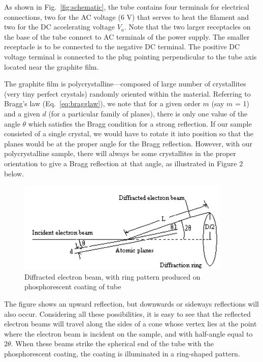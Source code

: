 As shown in Fig.~\ref{fig:schematic}, the tube contains four terminals for electrical
connections, two for the AC voltage (6 V) that serves to heat the
filament and two for the DC accelerating voltage $V_a$.
 Note that the two larger receptacles on the base of the tube connect
to AC terminals of the power supply.  The smaller receptacle is to be
connected to the negative DC terminal.  The positive DC voltage
terminal is connected to the plug pointing perpendicular to the tube
axis located near the graphite film.

The graphite film is polycrystalline---composed of large number of
crystallites (very tiny perfect crystals) randomly oriented within the
material.  Referring to Bragg's law (Eq.~\ref{eq:bragglaw}), we note
that for a given order $m$ (say $m$ = 1) and a given $d$ (for a particular
family of planes), there is only one value of the angle ${\theta}$
which satisfies the Bragg condition for a strong reflection.  If our
sample consisted of a single crystal, we would have to rotate it into
position so that the planes would be at the proper angle for the Bragg
reflection.  However, with our polycrystalline sample, there will
always be some crystallites in the proper orientation to give a Bragg
reflection at that angle, as illustrated in Figure 2 below.
\begin{figure}
\begin{centering}
\includegraphics[width=4in]{../images/ediffraction-img2.png}
\caption{Diffracted electron beam, with ring pattern produced on phosphorescent coating of tube}
\label{fig:rings}
\end{centering}
\end{figure}

The figure shows an upward reflection, but downwards or sideways
reflections will also occur. Considering all these possibilities, it is
easy to see that the reflected electron beams will travel along the
sides of a cone whose vertex lies at the point where the electron beam
is incident on the sample, and with half-angle equal to $2{\theta}$.
 When these beams strike the spherical end of the tube with the
phosphorescent coating, the coating is illuminated in a ring-shaped
pattern.

